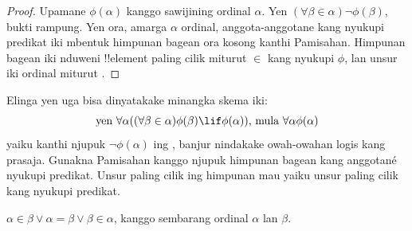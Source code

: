 \documentclass[../../../include/open-logic-section]{subfiles}
\begin{document}
\begin{proof}
Upamane $\phi(\alpha)$ kanggo sawijining ordinal
$\alpha$. Yen $ (\forall \beta \in \alpha)
\lnot \phi(\beta)$, bukti rampung. Yen ora, amarga
$\alpha$ ordinal, anggota-anggotane kang nyukupi
predikat iki mbentuk himpunan bagean ora kosong
kanthi Pamisahan. Himpunan bagean iki nduweni
!!{element} paling cilik miturut $\in$ kang nyukupi
$\phi$, lan unsur iki ordinal miturut
.
\end{proof}
\noindent
Elinga yen  uga bisa
dinyatakake minangka skema iki:
\[
\text{yen }\forall \alpha((\forall \beta \in \alpha)\phi(\beta) \lif 
\phi(\alpha))\text{, mula }\forall \alpha\phi(\alpha)
\]
yaiku kanthi njupuk $\lnot\phi(\alpha)$ ing
, banjur nindakake
owah-owahan logis kang prasaja.
Gunakna Pamisahan kanggo njupuk himpunan bagean kang anggotané nyukupi predikat. Unsur paling cilik ing himpunan mau yaiku unsur paling cilik kang nyukupi predikat.

\begin{thm}[Trikotomi]
$\alpha \in \beta \lor \alpha = \beta \lor \beta \in \alpha$,
kanggo sembarang ordinal $\alpha$ lan $\beta$.
\end{thm}
\end{document}
